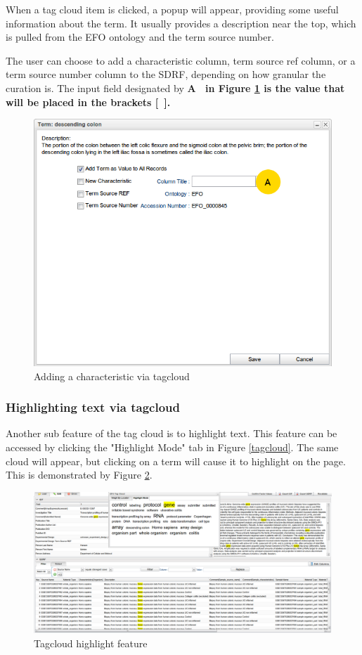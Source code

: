 \documentclass[a4paper]{article}
\begin{document}
When a tag cloud item is clicked, a popup will appear, providing some useful information about the term. It usually provides a description near the top, which is pulled from the EFO ontology and the term source number.

The user can choose to add a characteristic column, term source ref column, or a term source number column to the SDRF, depending on how granular the curation is. The input field designated by \bf{A}\rm~ in Figure \ref{tagcloudsubfeature} is the value that will be placed in the brackets [~].


\begin{figure}[h]
\caption{Adding a characteristic via tagcloud}
\centering
\label{tagcloudsubfeature}
\includegraphics[width=12cm]{images/tagcloud_subfeature}
\end{figure}

\newpage
\subsubsection*{Highlighting text via tagcloud}
Another sub feature of the tag cloud is to highlight text. This feature can be accessed by clicking the "Highlight Mode" tab in Figure \ref{tagcloud}. The same cloud will appear, but clicking on a term will cause it to highlight on the page. This is demonstrated by Figure \ref{highlight}.

\begin{figure}[h]
\caption{Tagcloud highlight feature}
\centering
\label{highlight}
\includegraphics[width=17cm]{images/highlight}
\end{figure}
\end{document}
